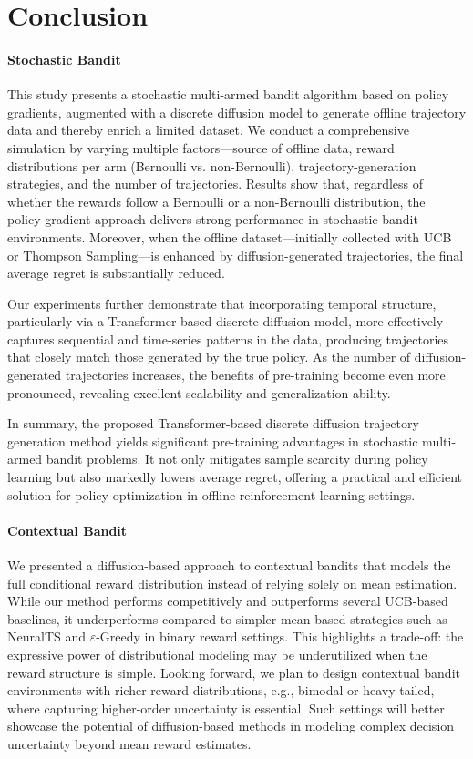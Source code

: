 \section{Conclusion} \label{sec:5_conclusion}

\paragraph{Stochastic Bandit}

This study presents a stochastic multi-armed bandit algorithm based on policy gradients, augmented with a discrete diffusion model to generate offline trajectory data and thereby enrich a limited dataset. We conduct a comprehensive simulation by varying multiple factors—source of offline data, reward distributions per arm (Bernoulli vs. non-Bernoulli), trajectory-generation strategies, and the number of trajectories. Results show that, regardless of whether the rewards follow a Bernoulli or a non-Bernoulli distribution, the policy-gradient approach delivers strong performance in stochastic bandit environments. Moreover, when the offline dataset—initially collected with UCB or Thompson Sampling—is enhanced by diffusion-generated trajectories, the final average regret is substantially reduced.

Our experiments further demonstrate that incorporating temporal structure, particularly via a Transformer-based discrete diffusion model, more effectively captures sequential and time-series patterns in the data, producing trajectories that closely match those generated by the true policy. As the number of diffusion-generated trajectories increases, the benefits of pre-training become even more pronounced, revealing excellent scalability and generalization ability.

In summary, the proposed Transformer-based discrete diffusion trajectory generation method yields significant pre-training advantages in stochastic multi-armed bandit problems. It not only mitigates sample scarcity during policy learning but also markedly lowers average regret, offering a practical and efficient solution for policy optimization in offline reinforcement learning settings.


\paragraph{Contextual Bandit}

We presented a diffusion-based approach to contextual bandits that models the full conditional reward distribution instead of relying solely on mean estimation. While our method performs competitively and outperforms several UCB-based baselines, it underperforms compared to simpler mean-based strategies such as NeuralTS and $\varepsilon$-Greedy in binary reward settings. This highlights a trade-off: the expressive power of distributional modeling may be underutilized when the reward structure is simple.
Looking forward, we plan to design contextual bandit environments with richer reward distributions, e.g., bimodal or heavy-tailed, where capturing higher-order uncertainty is essential. Such settings will better showcase the potential of diffusion-based methods in modeling complex decision uncertainty beyond mean reward estimates.
